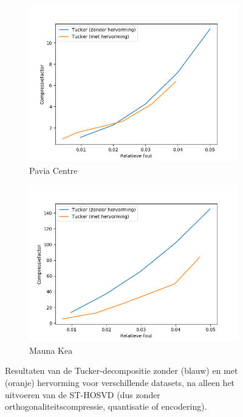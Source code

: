 \begin{figure}[H]
\begin{subfigure}{0.48\textwidth}
  \includegraphics[width=\linewidth]{images/reshaped_tucker_st_hosvd_results_Pavia_Centre.png}
  \caption{Pavia Centre}
\end{subfigure}
\begin{subfigure}{0.48\textwidth}
  \centering
  \includegraphics[width=\linewidth]{images/reshaped_tucker_st_hosvd_results_Mauna_Kea.png}
  \caption{Mauna Kea}
\end{subfigure}
\caption{Resultaten van de Tucker-decompositie zonder (blauw) en met (oranje) hervorming voor verschillende datasets, na alleen het uitvoeren van de ST-HOSVD (dus zonder orthogonaliteitscompressie, quantisatie of encodering).}
\label{fig:reshaped_tucker_st_hosvd_results}
\end{figure}

